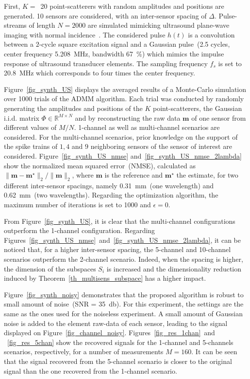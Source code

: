 \documentclass{article}
\newcommand{\vect}[1]{\bm{#1}}
\newcommand{\mat}[1]{\mathsf{#1}}
\theoremstyle{definition}
\begin{document}
First, $K=$~\num{20} point-scatterers with random amplitudes and positions are generated. 
\num{10} sensors are considered, with an inter-sensor spacing of $\Delta$. Pulse-streams of length $N = 2000$ are simulated mimicking ultrasound plane-wave imaging with normal incidence~\cite{montaldo_uffc_2014}.
The considered pulse $h\left(t\right)$ is a convolution between a $2$-cycle square excitation signal and a Gaussian pulse~(\num{2.5} cycles, center frequency \SI{5.208}{\mega\hertz}, bandwidth \SI{67}{\percent}) which mimics the impulse response of ultrasound transducer elements. The sampling frequency $f_s$ is set to \SI{20.8}{\mega\hertz} which corresponds to four times the center frequency.

Figure~\ref{fig_synth_US} displays the averaged results of a Monte-Carlo simulation over \num{1000} trials of the ADMM algorithm. 
Each trial was conducted by randomly generating the amplitudes and positions of the $K$ point-scatterers, the Gaussian i.i.d. matrix $\mat{\Phi} \in \mathbb{R}^{M \times N}$ and by reconstructing the raw data $\vect{m}$ of one sensor from different values of $M/N$. 1-channel as well as multi-channel scenarios are considered. 
For the multi-channel scenarios, prior knowledge on the support of the spike trains of $1, 4$ and $9$ neighboring sensors of the sensor of interest are considered. 
Figure~\ref{fig_synth_US_nmse} and~\ref{fig_synth_US_nmse_2lambda} show the normalized mean squared error~(NMSE), calculated as $\| \vect{m} - \vect{m}^\star \|_2 / \| \vect{m}\|_2$, where $\vect{m}$ is the reference and $\vect{m}^\star$ the estimate, for two different inter-sensor spacings, namely \SI{0.31}{\milli\metre}~(one wavelength) and \SI{0.62}{\milli\metre}~(two wavelengths). 
Regarding the optimization algorithm, the maximum number of iterations is set to \num{1000} and $\epsilon = 0$. 

From Figure~\ref{fig_synth_US}, it is clear that the multi-channel configurations outperform the 1-channel configuration. 
Regarding Figures~\ref{fig_synth_US_nmse}~and~\ref{fig_synth_US_nmse_2lambda}, it can be noticed that, for a higher inter-sensor spacing, the \num{5}-channel and \num{10}-channel scenarios outperform the \num{2}-channel scenario. 
Indeed, when the spacing is higher, the dimension of the subspaces $S_i$ is increased and the dimensionality reduction induced by Theorem~\ref{th_multisens_subspace} has a higher impact.

Figure~\ref{fig_synth_noisy} demonstrates that the proposed algorithm is robust to small amount of noise~(SNR = \SI{35}{\decibel}). 
For this experiment, the settings are the same as the ones used for the noiseless experiment. 
A small amount of Gaussian noise is added to the element raw-data of each sensor, leading to the signal displayed on Figure~\ref{fig_channel_noisy}. Figures~\ref{fig_res_1chan}~and ~\ref{fig_res_5chan} show the recovered signals for the \num{1}-channel and \num{5}-channels scenarios, respectively, for a number of measurements $M=160$. 
It can be seen that the signal recovered from the \num{5}-channel scenario is closer to the original signal than the one recovered from the \num{1}-channel scenario.
\end{document}
